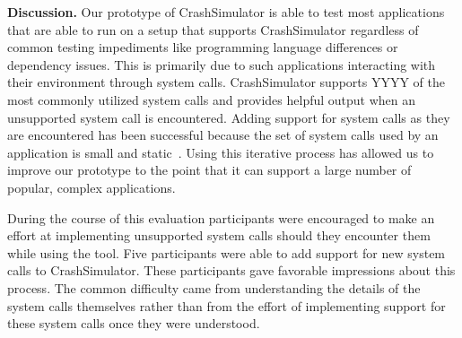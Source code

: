 {\bf Discussion.} Our prototype of CrashSimulator is able to test most
applications that are able to run on a setup that supports CrashSimulator
regardless of common testing impediments like programming language
differences or dependency issues.  This is primarily due to such
applications interacting with their environment through system calls.
CrashSimulator supports YYYY of the most commonly utilized system calls and
provides helpful output when an unsupported system call is encountered.
Adding support for system calls as they are encountered has been successful
because the set of system calls used by an application is small and
static~\cite{Tsai:2016:SML:2901318.2901341}.  Using this iterative process
has allowed us to improve our prototype to the point that it can support a
large number of popular, complex applications.

During the course of this evaluation participants were encouraged to make
an effort at implementing unsupported system calls should they encounter
them while using the tool.  Five participants were able to add support for
new system calls to CrashSimulator.  These participants gave favorable
impressions about this process.  The common difficulty came from
understanding the details of the system calls themselves rather than from
the effort of implementing support for these system calls once they were
understood.
